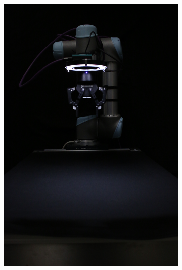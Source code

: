 \begin{figure}[htbp]
    \captionsetup[subfigure]{justification=centering}
    \centering
    \begin{subfigure}[b]{0.3\textwidth}
        \centering
        \includegraphics[angle=90, width=\textwidth]{figures/setupimages/setup_empty.JPG}



\end{subfigure}
\end{figure}
